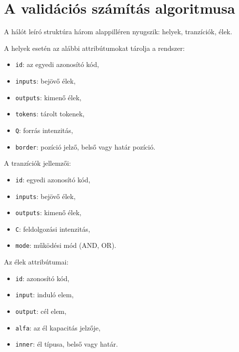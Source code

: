 \section{A validációs számítás algoritmusa}

A hálót leíró struktúra három alappilléren nyugszik: helyek, tranzíciók, élek.

A helyek esetén az alábbi attribútumokat tárolja a rendszer:
\begin{itemize}
\item \texttt{id}: az egyedi azonosító kód,
\item \texttt{inputs}: bejövő élek,
\item \texttt{outputs}: kimenő élek,
\item \texttt{tokens}: tárolt tokenek,
\item \texttt{Q}: forrás intenzitás,
\item \texttt{border}: pozíció jelző, belső vagy határ pozíció.
\end{itemize}        
A tranzíciók jellemzői:
\begin{itemize}
\item \texttt{id}: egyedi azonosító kód,
\item \texttt{inputs}: bejövő élek,
\item \texttt{outputs}: kimenő élek,
\item \texttt{C}: feldolgozási intenzitás,
\item \texttt{mode}: működési mód (AND, OR).
\end{itemize}
Az élek attribútumai:
\begin{itemize}
\item \texttt{id}: azonosító kód,
\item \texttt{input}: induló elem,
\item \texttt{output}: cél elem,
\item \texttt{alfa}: az él kapacitás jelzője,
\item \texttt{inner}: él típusa, belső vagy határ.
\end{itemize}

